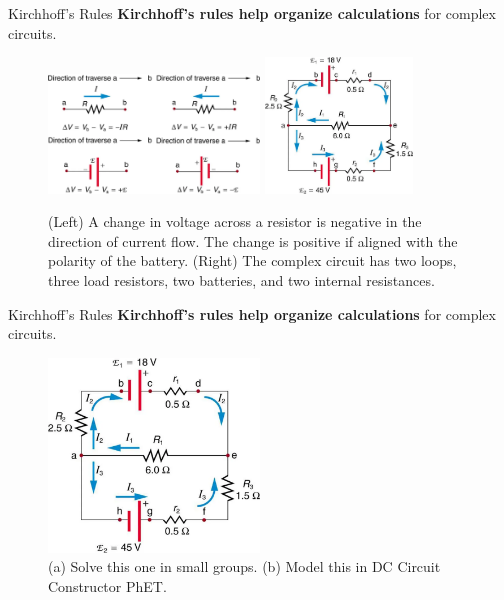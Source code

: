 \documentclass{beamer}
\begin{document}
\begin{frame}{Kirchhoff's Rules}
\small
\textbf{\alert{Kirchhoff's rules help organize calculations}} for complex circuits.
\begin{figure}
\includegraphics[width=0.5\textwidth]{figures/complex_2.png} \hspace{1cm}
\includegraphics[width=0.35\textwidth]{figures/complex_1.png}
\caption{\label{fig:kirch1} (Left) A change in voltage across a resistor is negative in the direction of current flow.  The change is positive if aligned with the polarity of the battery. (Right) The complex circuit has two loops, three load resistors, two batteries, and two internal resistances.}
\end{figure}
\end{frame}

\begin{frame}{Kirchhoff's Rules}
\small
\textbf{\alert{Kirchhoff's rules help organize calculations}} for complex circuits.
\begin{figure}
\includegraphics[width=0.5\textwidth]{figures/complex_1.png}
\caption{\label{fig:kirch1} (a) Solve this one in small groups. (b) Model this in DC Circuit Constructor PhET.}
\end{figure}
\end{frame}
\end{document}
